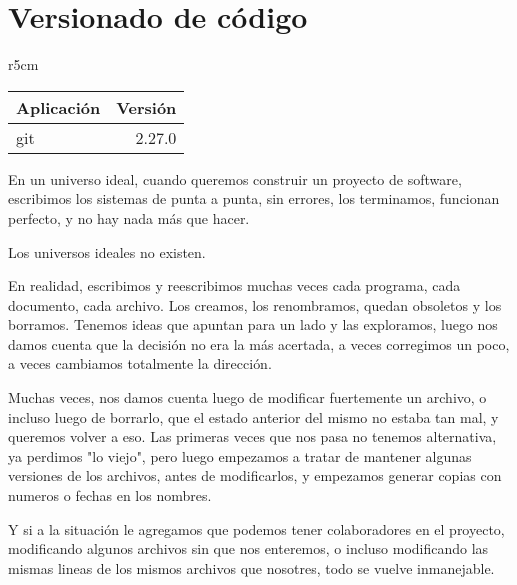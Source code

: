 

\chapter{Versionado de código} \label{ch:versionado}

\begin{wraptable}{r}{5cm}
\begin{modulesinfo}
\begin{center}
{\small
    \begin{tabular}{l r}
        \toprule
        \textbf{Aplicación} & \textbf{Versión} \\
        \midrule
        git & 2.27.0 \\
        \bottomrule
    \end{tabular}
}
\end{center}
\end{modulesinfo}
\end{wraptable}


En un universo ideal, cuando queremos construir un proyecto de software, escribimos los sistemas de punta a punta, sin errores, los terminamos, funcionan perfecto, y no hay nada más que hacer.

Los universos ideales no existen.

En realidad, escribimos y reescribimos muchas veces cada programa, cada documento, cada archivo. Los creamos, los renombramos, quedan obsoletos y los borramos. Tenemos ideas que apuntan para un lado y las exploramos, luego nos damos cuenta que la decisión no era la más acertada, a veces corregimos un poco, a veces cambiamos totalmente la dirección.

Muchas veces, nos damos cuenta luego de modificar fuertemente un archivo, o incluso luego de borrarlo, que el estado anterior del mismo no estaba tan mal, y queremos volver a eso. Las primeras veces que nos pasa no tenemos alternativa, ya perdimos "lo viejo", pero luego empezamos a tratar de mantener algunas versiones de los archivos, antes de modificarlos, y empezamos generar copias con numeros o fechas en los nombres.

Y si a la situación le agregamos que podemos tener colaboradores en el proyecto, modificando algunos archivos sin que nos enteremos, o incluso modificando las mismas lineas de los mismos archivos que nosotres, todo se vuelve inmanejable.

